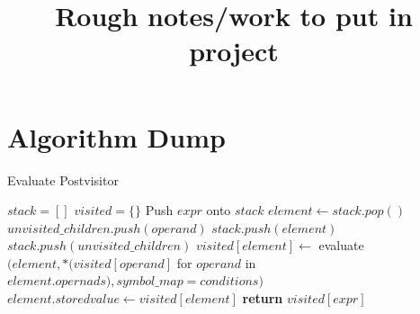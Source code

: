 \documentclass{article}
\title{Rough notes/work to put in project}
\date{}
\begin{document}
\maketitle
\tableofcontents
\newpage

\section{Algorithm Dump}

\begin{algorithm}
\caption{Evaluate Postvisitor}\label{evalpostvisitor}
\begin{algorithmic}[1]
\State $stack = []$
\State $visited = \{\}$
\State Push $expr$ onto $stack$
\State $element \gets stack.pop()$
\State $unvisited\_children.push(operand)$
\EndIf
\EndFor
{}
\State $stack.push(element)$
\State $stack.push(unvisited\_children)$
\Else
\State $visited[element] \gets$ evaluate$(element, *(visited[operand]$ for $operand$ in $element.opernads), symbol\_map = conditions)$
\State $element.storedvalue \gets visited[element]$
\EndIf
\EndWhile\label{euclidendwhile}
\State \textbf{return} $visited[expr]$
\EndProcedure
\end{algorithmic}
\end{algorithm}
\end{document}
